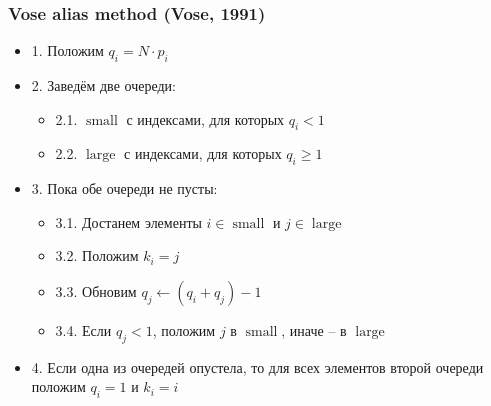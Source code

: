 \documentclass[10pt]{beamer}
\begin{document}
\begin{frame}
\frametitle{Vose alias method (Vose, 1991)}
\begin{itemize}
\item 1. Положим \begin{math}q_i = N \cdot p_i\end{math}
\pause
\item 2. Заведём две очереди:
\pause
\begin{itemize}
\item 2.1. \begin{math}\operatorname{small}\end{math} с индексами, для которых \begin{math}q_i < 1\end{math}
\pause
\item 2.2. \begin{math}\operatorname{large}\end{math} с индексами, для которых \begin{math}q_i \geq 1\end{math}
\end{itemize}
\pause
\item 3. Пока обе очереди не пусты:
\pause
\begin{itemize}
\item 3.1. Достанем элементы \begin{math}i \in \operatorname{small}\end{math} и \begin{math}j \in \operatorname{large}\end{math}
\pause
\item 3.2. Положим \begin{math}k_i = j\end{math}
\pause
\item 3.3. Обновим \begin{math}q_j \leftarrow (q_i + q_j) - 1\end{math}
\pause
\item 3.4. Если \begin{math}q_j < 1\end{math}, положим \begin{math}j\end{math} в \begin{math}\operatorname{small}\end{math}, иначе -- в \begin{math}\operatorname{large}\end{math}
\end{itemize}
\pause
\item 4. Если одна из очередей опустела, то для всех элементов второй очереди положим \begin{math}q_i = 1\end{math} и \begin{math}k_i = i\end{math}
\end{itemize}
\end{frame}
\end{document}
